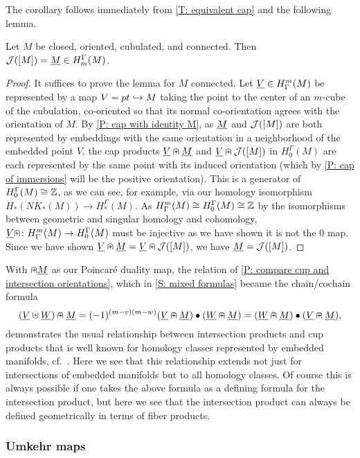 The corollary follows immediately from \cref{T: equivalent cap} and the following lemma.

\begin{lemma}
	Let $M$ be closed, oriented, cubulated, and connected.
	Then $\mathcal{J}([M]) = \underline{M} \in H_m^\Gamma(M)$.
\end{lemma}

\begin{proof}
	It suffices to prove the lemma for $M$ connected.
	Let $\underline{V} \in H^m_\Gamma(M)$ be represented by a map $V = pt \hookrightarrow M$ taking the point to the center of an $m$-cube of the cubulation, co-oriented so that its normal co-orientation agrees with the orientation of $M$.
	By \cref{P: cap with identity M}, as $\underline{M}$ and $\mathcal{J}([M])$ are both represented by embeddings with the same orientation in a neighborhood of the embedded point $V$, the cap products $\underline{V}\nplus \underline{M}$ and $\underline{V}\nplus \mathcal{J}([M])$ in $H_0^\Gamma(M)$ are each represented by the same point with its induced orientation (which by \cref{P: cap of immersions} will be the positive orientation).
	This is a generator of $H_0^\Gamma(M) \cong \mathbb{Z}$, as we can see, for example, via our homology isomorphism $H_*(NK_*(M)) \to H_*^\Gamma(M)$.
	As $H^m_\Gamma(M) \cong H_0^\Gamma(M) \cong \mathbb{Z}$ by the isomorphisms between geometric and singular homology and cohomology, $\underline{V}\nplus \colon H^m_\Gamma(M) \to H_0^\Gamma(M)$ must be injective as we have shown it is not the $0$ map.
	Since we have shown $\underline{V}\nplus\underline{M} = \underline{V}\nplus\mathcal{J}([M])$, we have $\underline{M} = \mathcal{J}([M])$.
\end{proof}

With $\nplus \underline{M}$ as our Poincar\'e duality map, the relation of \cref{P: compare cup and intersection orientations}, which in \cref{S: mixed formulas} became the chain/cochain formula
$$(\underline{V}\uplus \underline{W})\nplus \underline{M} = (-1)^{(m-v)(m-w)}(\underline{V}\nplus \underline{M})\bullet(\underline{W}\nplus \underline{M}) = (\underline{W}\nplus \underline{M})\bullet(\underline{V}\nplus \underline{M}),$$
demonstrates the usual relationship between intersection products and cup products that is well known for homology classes represented by embedded manifolds, cf.\ \cite[Section VI.11]{Bred97}.
Here we see that this relationship extends not just for intersections of embedded manifolds but to all homology classes.
Of course this is always possible if one takes the above formula as a defining formula for the intersection product, but here we see that the intersection product can always be defined geometrically in terms of fiber products.

\subsubsection{Umkehr maps}\label{S: umkehr}

